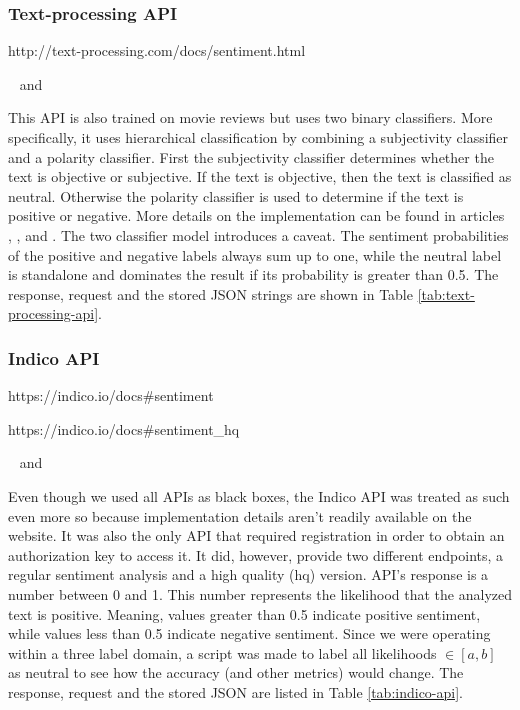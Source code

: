 \subsubsection*{Text-processing API}
\begin{description}
\singlespacing
 \item[Web url:] http://text-processing.com/docs/sentiment.html
 \item[Database columns:]  and 
\end{description}
This API is also trained on movie reviews but uses two binary classifiers. More specifically, it uses hierarchical classification by combining a subjectivity classifier and a polarity classifier. First the subjectivity classifier determines whether the text is objective or subjective. If the text is objective, then the text is classified as neutral. Otherwise the polarity classifier is used to determine if the text is positive or negative.  More details on the implementation can be found in articles  \cite{NaiveBayes}, \cite{Stopwords}, \cite{LowInformationFeatures} and \cite{HierarchicalClassification}.
The two classifier model introduces a caveat. The sentiment probabilities of the positive and negative labels always sum up to one, while the neutral label is standalone and dominates the result if its probability is greater than 0.5.
The response, request and the stored JSON strings are shown in Table \ref{tab:text-processing-api}.


\newpage

\subsubsection*{Indico API}
\begin{description}
\singlespacing
 \item[Web url:] https://indico.io/docs\#sentiment 
 \item[Web url (hq):] https://indico.io/docs\#sentiment\_hq 
 \item[Database columns:]  and 
\end{description}
Even though we used all APIs as black boxes, the Indico API was treated as such even more so because implementation details aren't readily available on the website. 
It was also the only API that required registration in order to obtain an authorization key to access it. 
It did, however, provide two different endpoints, a regular sentiment analysis and a high quality (hq) version.
API's response is a number between 0 and 1. 
This number represents the likelihood that the analyzed text is positive. 
Meaning, values greater than 0.5 indicate positive sentiment, while values less than 0.5 indicate negative sentiment. 
Since we were operating within a three label domain, a script was made to label all likelihoods $\in[a,b]$ as neutral to see how the accuracy (and other metrics) would change.
The response, request and the stored JSON are listed in Table \ref{tab:indico-api}.


